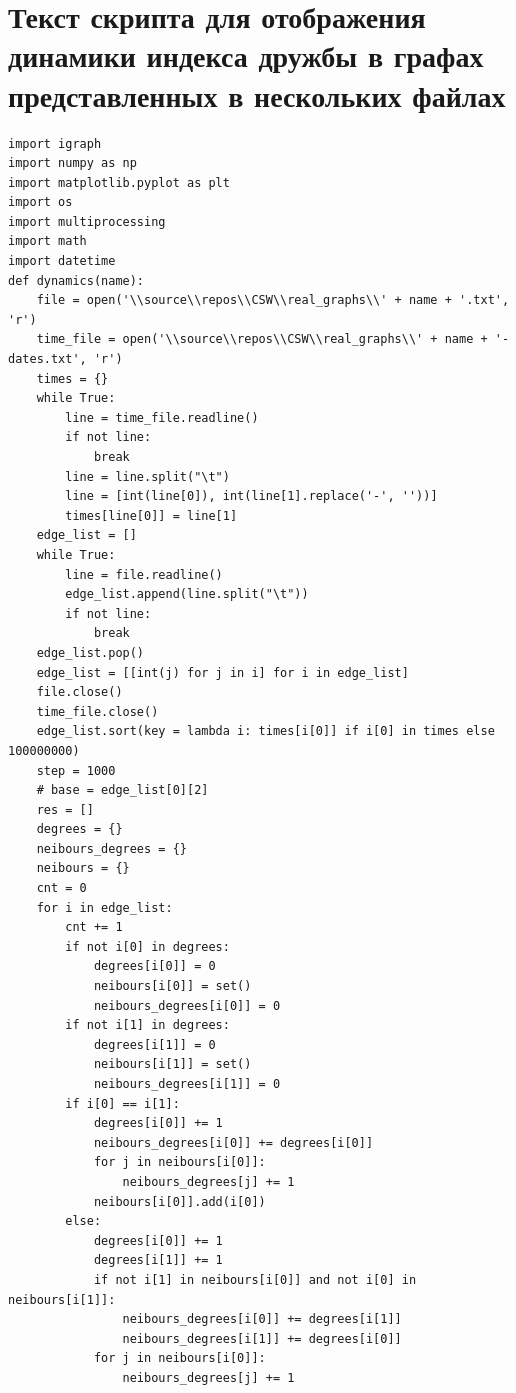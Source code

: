 \documentclass[bachelor, och, diploma]{SCWorks}
\begin{document}
\section{Текст скрипта для отображения динамики индекса дружбы в графах представленных в нескольких файлах}\label{app:rgp}
\begin{verbatim}
import igraph
import numpy as np
import matplotlib.pyplot as plt
import os
import multiprocessing 
import math
import datetime
def dynamics(name):
    file = open('\\source\\repos\\CSW\\real_graphs\\' + name + '.txt', 'r')
    time_file = open('\\source\\repos\\CSW\\real_graphs\\' + name + '-dates.txt', 'r')
    times = {}
    while True:
        line = time_file.readline()
        if not line:
            break
        line = line.split("\t")
        line = [int(line[0]), int(line[1].replace('-', ''))]
        times[line[0]] = line[1]
    edge_list = []
    while True:
        line = file.readline()
        edge_list.append(line.split("\t"))
        if not line:
            break
    edge_list.pop()
    edge_list = [[int(j) for j in i] for i in edge_list]
    file.close()
    time_file.close()
    edge_list.sort(key = lambda i: times[i[0]] if i[0] in times else 100000000)
    step = 1000
    # base = edge_list[0][2]
    res = []
    degrees = {}
    neibours_degrees = {}
    neibours = {}
    cnt = 0
    for i in edge_list:
        cnt += 1
        if not i[0] in degrees:
            degrees[i[0]] = 0
            neibours[i[0]] = set()
            neibours_degrees[i[0]] = 0
        if not i[1] in degrees:
            degrees[i[1]] = 0
            neibours[i[1]] = set()
            neibours_degrees[i[1]] = 0
        if i[0] == i[1]:
            degrees[i[0]] += 1
            neibours_degrees[i[0]] += degrees[i[0]]
            for j in neibours[i[0]]:
                neibours_degrees[j] += 1
            neibours[i[0]].add(i[0])
        else:
            degrees[i[0]] += 1
            degrees[i[1]] += 1
            if not i[1] in neibours[i[0]] and not i[0] in neibours[i[1]]:
                neibours_degrees[i[0]] += degrees[i[1]]
                neibours_degrees[i[1]] += degrees[i[0]]
            for j in neibours[i[0]]:
                neibours_degrees[j] += 1

\end{verbatim}
\end{document}

